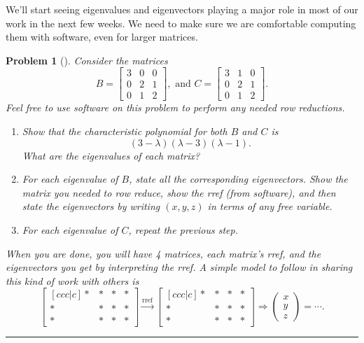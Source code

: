 \documentclass[letterpaper,oneside]{book}%
\theoremstyle{plain}
\theoremstyle{box}
\theoremstyle{problem}
\newtheorem{problemnum}{Problem}[chapter]
\newenvironment{problem}[1][]{\begin{problemnum}[#1]}{\end{problemnum}\nopagebreak\hrule\bigskip}
\newcommand{\pvec}[1]{\begin{pmatrix} #1 \end{pmatrix}}
\newcommand{\bvec}[1]{\begin{bmatrix} #1 \end{bmatrix}}
\begin{document}
We'll start seeing eigenvalues and eigenvectors playing a major role in most of our work in the next few weeks. We need to make sure we are comfortable computing them with software, even for larger matrices. 
\begin{problem}
Consider the matrices 
$$
B=
\begin{bmatrix}
 3 & 0 & 0 \\
 0 & 2 & 1 \\
 0 & 1 & 2
\end{bmatrix}
,\text{ and } 
C=
\begin{bmatrix}
 3 & 1 & 0 \\
 0 & 2 & 1 \\
 0 & 1 & 2
\end{bmatrix}
.$$
Feel free to use software on this problem to perform any needed row reductions. 
\begin{enumerate}
\item Show that the characteristic polynomial for both $B$ and $C$ is $$(3-\lambda)(\lambda-3)(\lambda -1).$$  What are the eigenvalues of each matrix?
\item For each eigenvalue of $B$, state all the corresponding eigenvectors. Show the matrix you needed to row reduce, show the rref (from software), and then state the eigenvectors by writing $(x,y,z)$ in terms of any free variable.
\item For each eigenvalue of $C$, repeat the previous step.
\end{enumerate}
When you are done, you will have 4 matrices, each matrix's rref, and the eigenvectors you get by interpreting the rref.  A simple model to follow in sharing this kind of work with others is 
$$\bvec{[ccc|c]*&*&*&*\\ *&*&*&*\\ *&*&*&*}\xrightarrow{\text{rref}} \bvec{[ccc|c]*&*&*&*\\ *&*&*&*\\ *&*&*&*} \Rightarrow \pvec{x\\y\\z}=\cdots.$$ 
\end{problem}
\end{document}
